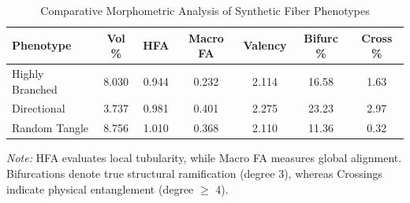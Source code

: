 \begin{table}[h!]
\centering
\caption{Comparative Morphometric Analysis of Synthetic Fiber Phenotypes}
\label{tab:fiber_metrics}
\begin{tabular}{l | c c c c c c}
\hline
\textbf{Phenotype} & \textbf{Vol \%} & \textbf{HFA} & \textbf{Macro FA} & \textbf{Valency} & \textbf{Bifurc \%} & \textbf{Cross \%} \\
\hline
Highly Branched & 8.030 & 0.944 & 0.232 & 2.114 & 16.58 & 1.63 \\
Directional & 3.737 & 0.981 & 0.401 & 2.275 & 23.23 & 2.97 \\
Random Tangle & 8.756 & 1.010 & 0.368 & 2.110 & 11.36 & 0.32 \\
\hline
\end{tabular}
\vspace{1ex}
\raggedright \small{\textit{Note:} HFA evaluates local tubularity, while Macro FA measures global alignment. Bifurcations denote true structural ramification (degree 3), whereas Crossings indicate physical entanglement (degree $\ge$ 4).}
\end{table}